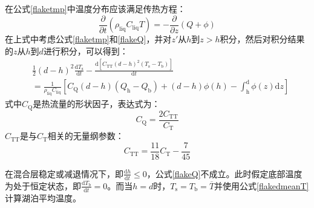 在公式\eqref{flaketmp}中温度分布应该满足传热方程：
\begin{equation}\label{flakedrhocT}
    \frac{\partial}{\partial t} \left( \rho_{\mathrm{liq}} C_{\mathrm{liq}} T \right) = -\frac{\partial}{\partial z} \left( Q + \phi \right)
\end{equation}
在上式中考虑公式\eqref{flaketmp}和\eqref{flakeQ}，并对$z'$从$h$到$z > h$积分，然后对积分结果的$z$从$h$到$d$进行积分，可以得到：
\begin{equation}\label{flakennnn}
\begin{split}
    &\frac{1}{2} (d - h)^{\mathrm{2}} \frac{\mathrm{d} T_{\mathrm{s}}}{\mathrm{d} t} - \frac{\mathrm{d} \left[ C_{\mathrm{TT}} (d - h)^{\mathrm{2}} (T_{\mathrm{s}} - T_{\mathrm{b}}) \right]} {\mathrm{d} t}  \\
    &= \frac{1}{\rho_{\mathrm{liq}} C_{\mathrm{liq}}} \left[ C_{\mathrm{Q}} (d - h)(Q_{\mathrm{h}} - Q_{\mathrm{b}}) + (d - h) \phi(h) - \int_{\mathrm{h}} ^ {\mathrm{d}} \phi(z) {\mathrm{d}} z \right]
\end{split}
\end{equation}
式中$C_{\mathrm{Q}}$是热流量的形状因子，表达式为：
\begin{equation}
    C_{\mathrm{Q}} = \frac{2 C_{\mathrm{TT}}}{C_{\mathrm{T}}}
\end{equation}
$C_{\mathrm{TT}}$是与$C_{\mathrm{T}}$相关的无量纲参数：
\begin{equation}
    C_{\mathrm{TT}} = \frac{11}{18} C_{\mathrm{T}} - \frac{7}{45}
\end{equation}

在混合层稳定或减退情况下，即$\frac{\mathrm{d} h}{\mathrm{d} t} \leqslant 0$，公式\eqref{flakeQ}不成立。此时假定底部温度为处于恒定状态，即$\frac{\mathrm{d} T_{\mathrm{b}}}{\mathrm{d} t} = 0$。而当$h = d$时，$T_{\mathrm{s}} = T_{\mathrm{b}} = \overline{T}$并使用公式\eqref{flakedmeanT}计算湖泊平均温度。

